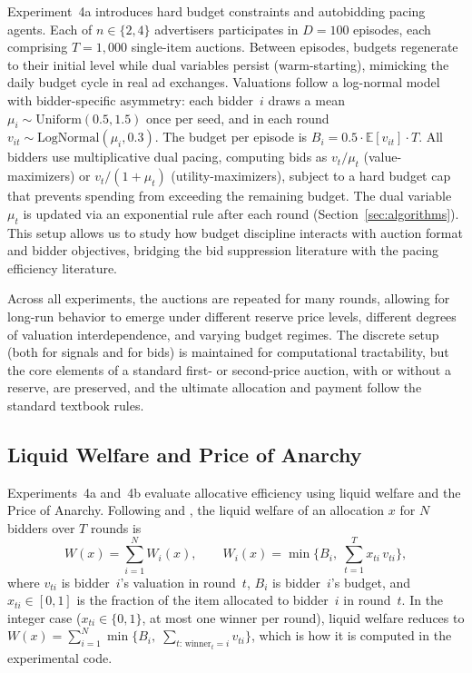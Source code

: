 Experiment~4a introduces hard budget constraints and autobidding pacing agents. Each of $n \in \{2, 4\}$ advertisers participates in $D = 100$ episodes, each comprising $T = 1{,}000$ single-item auctions. Between episodes, budgets regenerate to their initial level while dual variables persist (warm-starting), mimicking the daily budget cycle in real ad exchanges. Valuations follow a log-normal model with bidder-specific asymmetry: each bidder~$i$ draws a mean $\mu_i \sim \mathrm{Uniform}(0.5, 1.5)$ once per seed, and in each round $v_{it} \sim \mathrm{LogNormal}(\mu_i, 0.3)$. The budget per episode is $B_i = 0.5 \cdot \mathbb{E}[v_{it}] \cdot T$. All bidders use multiplicative dual pacing, computing bids as $v_t / \mu_t$ (value-maximizers) or $v_t / (1 + \mu_t)$ (utility-maximizers), subject to a hard budget cap that prevents spending from exceeding the remaining budget. The dual variable $\mu_t$ is updated via an exponential rule after each round (Section~\ref{sec:algorithms}). This setup allows us to study how budget discipline interacts with auction format and bidder objectives, bridging the bid suppression literature with the pacing efficiency literature.

Across all experiments, the auctions are repeated for many rounds, allowing for long-run behavior to emerge under different reserve price levels, different degrees of valuation interdependence, and varying budget regimes. The discrete setup (both for signals and for bids) is maintained for computational tractability, but the core elements of a standard first- or second-price auction, with or without a reserve, are preserved, and the ultimate allocation and payment follow the standard textbook rules.

\subsection{Liquid Welfare and Price of Anarchy}
\label{sec:welfare}

Experiments~4a and~4b evaluate allocative efficiency using liquid welfare and the Price of Anarchy. Following \citet{Gaitonde2023} and \citet{Deng2021TowardsEfficient}, the liquid welfare of an allocation $x$ for $N$ bidders over $T$ rounds is
\begin{equation}
  W(x) = \sum_{i=1}^{N} W_i(x), \qquad
  W_i(x) = \min\!\Big\{B_i,\; \sum_{t=1}^{T} x_{ti}\, v_{ti}\Big\},
  \label{eq:liquid_welfare_def}
\end{equation}
where $v_{ti}$ is bidder~$i$'s valuation in round~$t$, $B_i$ is bidder~$i$'s budget, and $x_{ti} \in [0,1]$ is the fraction of the item allocated to bidder~$i$ in round~$t$. In the integer case ($x_{ti} \in \{0,1\}$, at most one winner per round), liquid welfare reduces to $W(x) = \sum_{i=1}^{N} \min\{B_i,\; \sum_{t:\, \text{winner}_t = i} v_{ti}\}$, which is how it is computed in the experimental code.

